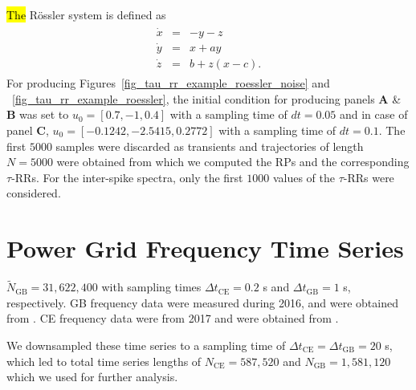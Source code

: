 \documentclass[entropy,article,accept,pdftex,moreauthors]{Definitions/mdpi}
\begin{document}
\hl{The} R\"ossler system \cite{roessler1976} is defined as
\begin{align}
\begin{array}{rcl}
\dot{x}&=&-y-z \\
\dot{y}&=&x+ay \\
\dot{z}&=&b+ z(x-c) .
\end{array}
\label{eq_model_roessler}
\end{align}
{For} producing Figures~\ref{fig_tau_rr_example_roessler_noise} and ~\ref{fig_tau_rr_example_roessler}, the initial condition for producing panels \textbf{A} \& \textbf{B} was set to $u_0=[0.7, -1, 0.4]$ with a sampling time 
of $dt=0.05$ and in case of panel \textbf{C}, $u_0=[-0.1242, -2.5415, 0.2772]$ with a sampling time of $dt=0.1$. The first $5000$ samples were discarded as transients and trajectories of length $N=5000$ were 
obtained from which we computed the RPs and the corresponding $\tau$-RRs. For the inter-spike spectra, only the first $1000$ values of the $\tau$-RRs were considered.

\section{Power Grid Frequency Time Series}\label{sec_power_grid_appendix}

 \mbox{$\tilde{N}_{\text{GB}}=31,622,400$} with sampling times $\Delta t_{\text{CE}}=0.2$ \si{s} and 
$\Delta t_{\text{GB}}=1$ \si{s}, respectively. GB frequency data were measured during 2016, and were obtained from \cite{GB}. CE frequency data were from 2017 and were obtained from \cite{haehne2018footprint}.
  
We downsampled these time series to a sampling time of $\Delta t_{\text{CE}}= \Delta t_{\text{GB}}=20$ \si{s}, which led to total time series lengths of 
$N_{\text{CE}}=587,520$ and $N_{\text{GB}}=1,581,120$ which we used for further analysis.
\end{document}
